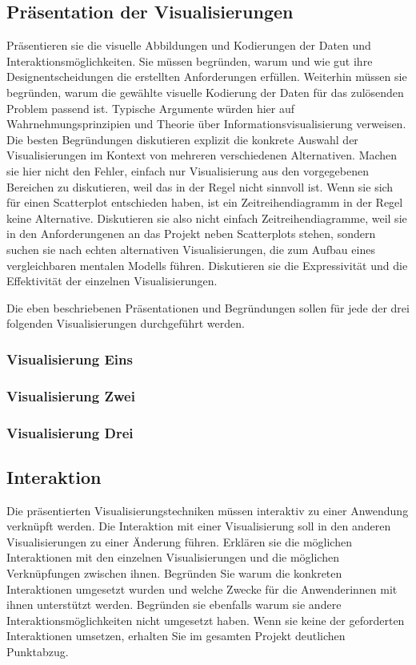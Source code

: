 \subsection{Präsentation der Visualisierungen}
Präsentieren sie die visuelle Abbildungen und Kodierungen der Daten und Interaktionsmöglichkeiten. 
Sie müssen  begründen, warum und wie gut ihre Designentscheidungen die erstellten Anforderungen erfüllen. 
Weiterhin müssen sie begründen, warum die gewählte visuelle Kodierung der Daten für das zulösenden Problem passend ist.
Typische Argumente würden hier auf Wahrnehmungsprinzipien und Theorie über Informationsvisualisierung verweisen. 
Die besten Begründungen diskutieren explizit die konkrete Auswahl der Visualisierungen im Kontext von mehreren verschiedenen Alternativen. 
Machen sie hier nicht den Fehler, einfach nur Visualisierung aus den vorgegebenen Bereichen zu diskutieren, weil das in der Regel nicht sinnvoll ist.
Wenn sie sich für einen Scatterplot entschieden haben, ist ein Zeitreihendiagramm in der Regel keine Alternative.
Diskutieren sie also nicht einfach Zeitreihendiagramme, weil sie in den Anforderungenen an das Projekt neben Scatterplots stehen, sondern suchen sie nach echten alternativen Visualisierungen, die zum Aufbau eines vergleichbaren mentalen Modells führen. 
Diskutieren sie die Expressivität und die Effektivität der einzelnen Visualisierungen. 

Die eben beschriebenen Präsentationen und Begründungen sollen für jede der drei folgenden Visualisierungen durchgeführt werden. 
\subsubsection{Visualisierung Eins}
\subsubsection{Visualisierung Zwei}
\subsubsection{Visualisierung Drei}

\subsection{Interaktion}
Die präsentierten Visualisierungstechniken müssen interaktiv zu einer Anwendung verknüpft werden.
Die Interaktion mit einer Visualisierung soll in den anderen Visualisierungen zu einer Änderung führen. 
Erklären sie die möglichen Interaktionen mit den einzelnen Visualisierungen und die möglichen Verknüpfungen zwischen ihnen. Begründen Sie warum die konkreten Interaktionen umgesetzt wurden und welche Zwecke für die Anwenderinnen mit ihnen unterstützt werden. Begründen sie ebenfalls warum sie andere Interaktionsmöglichkeiten nicht umgesetzt haben. Wenn sie keine der geforderten Interaktionen umsetzen, erhalten Sie im gesamten Projekt deutlichen Punktabzug. 
